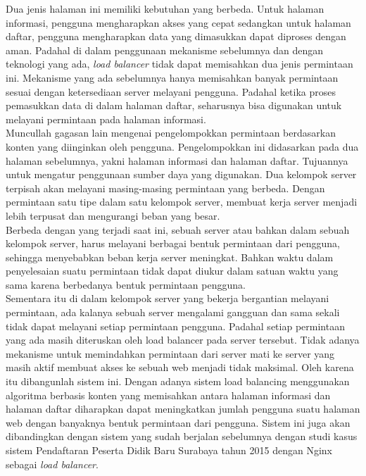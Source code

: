 \documentclass{ta-its}
\begin{document}
			\indent Dua jenis halaman ini memiliki kebutuhan yang berbeda. Untuk halaman informasi, pengguna mengharapkan akses yang cepat sedangkan untuk halaman daftar, pengguna mengharapkan data yang dimasukkan dapat diproses dengan aman. Padahal di dalam penggunaan mekanisme sebelumnya dan dengan teknologi yang ada, \emph{load balancer} tidak dapat memisahkan dua jenis permintaan ini. Mekanisme yang ada sebelumnya hanya memisahkan banyak permintaan sesuai dengan ketersediaan server melayani pengguna. Padahal ketika proses pemasukkan data di dalam halaman daftar, seharusnya bisa digunakan untuk melayani permintaan pada halaman informasi. \\
			\indent Muncullah gagasan lain mengenai pengelompokkan permintaan berdasarkan konten yang diinginkan oleh pengguna. Pengelompokkan ini didasarkan pada dua halaman sebelumnya, yakni halaman informasi dan halaman daftar. Tujuannya untuk mengatur penggunaan sumber daya yang digunakan. Dua kelompok server terpisah akan melayani masing-masing permintaan yang berbeda. Dengan permintaan satu tipe dalam satu kelompok server, membuat kerja server menjadi lebih terpusat dan mengurangi beban yang besar. \\
			\indent Berbeda dengan yang terjadi saat ini, sebuah server atau bahkan dalam sebuah kelompok server, harus melayani berbagai bentuk permintaan dari pengguna, sehingga menyebabkan beban kerja server meningkat. Bahkan waktu dalam penyelesaian suatu permintaan tidak dapat diukur dalam satuan waktu yang sama karena berbedanya bentuk permintaan pengguna. \\
			\indent Sementara itu di dalam kelompok server yang bekerja bergantian melayani permintaan, ada kalanya sebuah server mengalami gangguan dan sama sekali tidak dapat melayani setiap permintaan pengguna. Padahal setiap permintaan yang ada masih diteruskan oleh load balancer pada server tersebut. Tidak adanya mekanisme untuk memindahkan permintaan dari server mati ke server yang masih aktif membuat akses ke sebuah web menjadi tidak maksimal.
			Oleh karena itu dibangunlah sistem ini. Dengan adanya sistem load balancing menggunakan algoritma berbasis konten yang memisahkan antara halaman informasi dan halaman daftar diharapkan dapat meningkatkan jumlah pengguna suatu halaman web dengan banyaknya bentuk permintaan dari pengguna. Sistem ini juga akan dibandingkan dengan sistem yang sudah berjalan sebelumnya dengan studi kasus sistem Pendaftaran Peserta Didik Baru Surabaya tahun 2015 dengan Nginx sebagai \textit{load balancer}.
\end{document}
